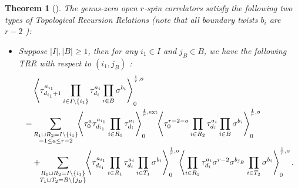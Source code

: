 \documentclass[11pt]{amsart}
\newtheorem{thm}[dummy]{Theorem}
\theoremstyle{definition}
\theoremstyle{remark}
\newcommand{\<}{\left<}
\renewcommand{\>}{\right>}
\numberwithin{equation}{section}
\begin{document}
    \begin{thm}[{\cite[Theorem 4.1]{BCT2}}]\label{thm TRR BCT}
    The genus-zero open $r$-spin correlators satisfy the following two types of Topological Recursion Relations (note that all boundary twists $b_i$ are $r-2$%
):
\begin{itemize}
\item[(a)] Suppose %
$\lvert I \rvert, \lvert B \rvert\ge 1$, then for any $i_1\in I$ and $j_B\in B$, we have the following TRR with respect to $(i_1,j_B)$%
:
\begin{equation}\label{eq: bct trr 1}
\begin{split}
&\left\langle \tau_{d_{i_1}+1}^{a_{i_1}}\prod_{i\in I\setminus \{i_1\}}\tau^{a_i}_{d_i}\prod_{i\in B}\sigma^{b_i}\right\rangle^{\frac{1}{r},o}_0\hspace{-0.2cm}\\
=&\sum_{\substack{R_1 \sqcup R_2 = I \setminus \{{i_1}\}\\ -1\le a \le r-2}}\hspace{-0.1cm}\left\langle \tau_0^{a}\tau_{d_{i_1}}^{a_{i_1}}\prod_{i \in R_1}\tau_{d_i}^{a_i}\right\rangle^{\frac{1}{r},\text{ext}}_0
\hspace{-0.1cm}\left\langle \tau_0^{r-2-a}\prod_{i\in R_2}\tau^{a_i}_{d_i}\prod_
{i\in B}\sigma^{b_i}\right\rangle^{\frac{1}{r},o}_0\\
&+\hspace{-0.1cm}\sum_{\substack{R_1 \sqcup R_2 =  I \setminus \{{i_1}\} \\ T_1 \sqcup T_2 = B\setminus \{j_B\}}} \hspace{-0.1cm} \left\langle \tau^{a_{i_1}}_{d_{i_1}}\prod_{i \in R_1} \tau^{a_i}_{d_i}\prod_{i\in T_1}\sigma^{b_i}\right\rangle^{\frac{1}{r},o}_0 \hspace{-0.1cm}\left\langle \prod_{i \in R_2} \tau^{a_i}_{d_i} \sigma^{r-2}\sigma^{b_{j_B}}\prod_{i\in T_2}\sigma^{b_i}\right\rangle^{\frac{1}{r}, o}_0.
    \end{split}
\end{equation}


\end{itemize}
\end{thm}
\end{document}
